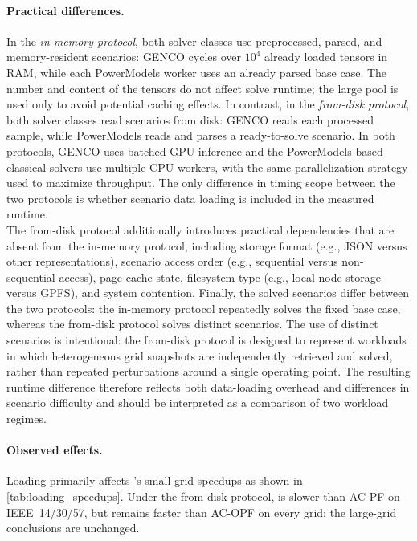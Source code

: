 \paragraph{Practical differences.}

In the \emph{in-memory protocol}, both solver classes use preprocessed, parsed, and memory-resident scenarios: GENCO cycles over $10^4$ already loaded tensors in RAM, while each PowerModels worker uses an already parsed base case. The number and content of the tensors do not affect solve runtime; the large pool is used only to avoid potential caching effects. In contrast, in the \emph{from-disk protocol}, both solver classes read scenarios from disk: GENCO reads each processed sample, while PowerModels reads and parses a ready-to-solve \datakit scenario. In both protocols, GENCO uses batched GPU inference and the PowerModels-based classical solvers use multiple CPU workers, with the same parallelization strategy used to maximize throughput. The only difference in timing scope between the two protocols is whether scenario data loading is included in the measured runtime.\\

The from-disk protocol additionally introduces practical dependencies that are absent from the in-memory protocol, including storage format (e.g., JSON versus other representations), scenario access order (e.g., sequential versus non-sequential access), page-cache state, filesystem type (e.g., local node storage versus GPFS), and system contention. Finally, the solved scenarios differ between the two protocols: the in-memory protocol repeatedly solves the fixed base case, whereas the from-disk protocol solves distinct \datakit scenarios. The use of distinct \datakit scenarios is intentional: the from-disk protocol is designed to represent workloads in which heterogeneous grid snapshots are independently retrieved and solved, rather than repeated perturbations around a single operating point. The resulting runtime difference therefore reflects both data-loading overhead and differences in scenario difficulty and should be interpreted as a comparison of two workload regimes.




\paragraph{Observed effects.}

Loading primarily affects \genco's small-grid speedups as shown in \cref{tab:loading_speedups}. Under the from-disk protocol, \genco is slower than AC-PF on IEEE~14/30/57, but remains faster than AC-OPF on every grid; the large-grid conclusions are unchanged.\\

